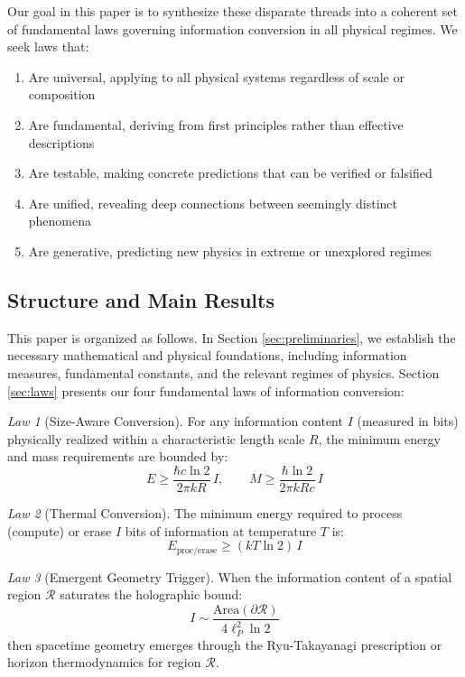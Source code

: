 \documentclass[11pt,a4paper]{article}
\theoremstyle{plain}
\theoremstyle{definition}
\theoremstyle{remark}
\newtheorem{law}{Law}
\begin{document}
Our goal in this paper is to synthesize these disparate threads into a coherent set of fundamental laws governing information conversion in all physical regimes. We seek laws that:

\begin{enumerate}[leftmargin=*]
\item Are universal, applying to all physical systems regardless of scale or composition
\item Are fundamental, deriving from first principles rather than effective descriptions
\item Are testable, making concrete predictions that can be verified or falsified
\item Are unified, revealing deep connections between seemingly distinct phenomena
\item Are generative, predicting new physics in extreme or unexplored regimes
\end{enumerate}

\subsection{Structure and Main Results}

This paper is organized as follows. In Section \ref{sec:preliminaries}, we establish the necessary mathematical and physical foundations, including information measures, fundamental constants, and the relevant regimes of physics. Section \ref{sec:laws} presents our four fundamental laws of information conversion:

\begin{law}[Size-Aware Conversion]
For any information content $I$ (measured in bits) physically realized within a characteristic length scale $R$, the minimum energy and mass requirements are bounded by:
\begin{equation}
E \geq \frac{\hbar c\ln 2}{2\pi k R}\,I, \qquad M \geq \frac{\hbar\ln 2}{2\pi k R c}\,I
\label{eq:law1}
\end{equation}
\end{law}

\begin{law}[Thermal Conversion]
The minimum energy required to process (compute) or erase $I$ bits of information at temperature $T$ is:
\begin{equation}
E_{\text{proc/erase}} \geq (kT\ln 2)\,I
\label{eq:law2}
\end{equation}
\end{law}

\begin{law}[Emergent Geometry Trigger]
When the information content of a spatial region $\mathcal{R}$ saturates the holographic bound:
\begin{equation}
I \sim \frac{\text{Area}(\partial\mathcal{R})}{4\ell_P^2\ln 2}
\label{eq:law3}
\end{equation}
then spacetime geometry emerges through the Ryu-Takayanagi prescription or horizon thermodynamics for region $\mathcal{R}$.
\end{law}
\end{document}
